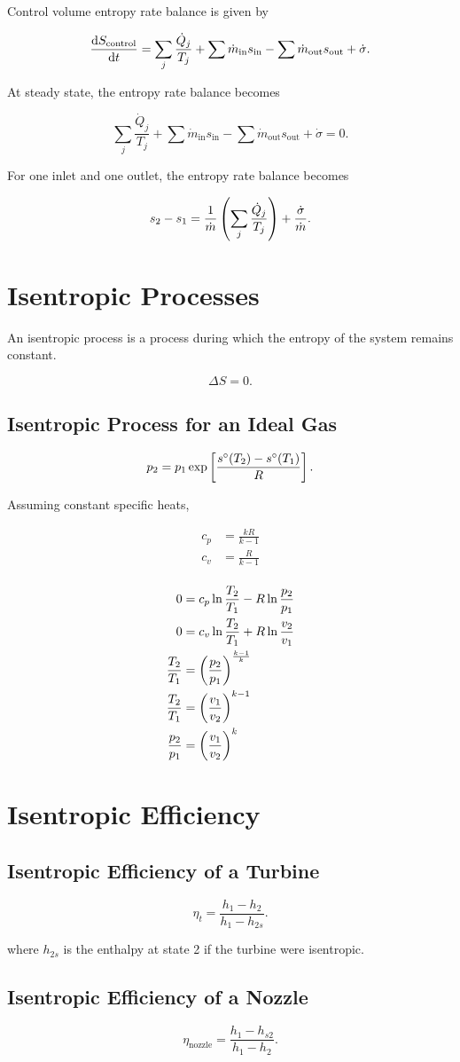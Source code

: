 \documentclass{report}
\begin{document}
Control volume entropy rate balance is given by

\[
	\dv{S_\text{control}}{t} = \sum_j \frac{\dot{Q}_j}{T_j} + \sum \dot{m}_\text{in} s_\text{in} - \sum \dot{m}_\text{out} s_\text{out} + \dot{\sigma}
	.\]

At steady state, the entropy rate balance becomes

\[
	\sum_j \frac{\dot{Q}_j}{T_j} + \sum \dot{m}_\text{in} s_\text{in} - \sum \dot{m}_\text{out} s_\text{out} + \dot{\sigma} = 0
	.\]

For one inlet and one outlet, the entropy rate balance becomes

\[
	s_2 - s_1 = \frac{1}{\dot{m}} \left( \sum_j \frac{\dot{Q}_j}{T_j} \right) + \frac{\dot{\sigma}}{\dot{m}}
	.\]

\section{Isentropic Processes}

An isentropic process is a process during which the entropy of the system remains constant.

\[
	\Delta S = 0
	.\]

\subsection{Isentropic Process for an Ideal Gas}

\[
	p_2 = p_1 \exp\left[ \frac{s^\circ(T_2) - s^\circ(T_1)}{R} \right]
	.\]

Assuming constant specific heats,

\begin{align*}
	c_p & = \frac{kR}{k-1} \\
	c_v & = \frac{R}{k-1}  \\
\end{align*}

\begin{align*}
	0               & = c_p \ln\frac{T_2}{T_1} - R\ln\frac{p_2}{p_1} \\
	0               & = c_v \ln\frac{T_2}{T_1} + R\ln\frac{v_2}{v_1} \\
	\frac{T_2}{T_1} & = \left(\frac{p_2}{p_1}\right)^{\frac{k-1}{k}}      \\
	\frac{T_2}{T_1} & = \left(\frac{v_1}{v_2}\right)^{k-1}                \\
	\frac{p_2}{p_1} & = \left(\frac{v_1}{v_2}\right)^k
\end{align*}

\section{Isentropic Efficiency}

\subsection{Isentropic Efficiency of a Turbine}

\[
	\eta_t = \frac{h_1 - h_2}{h_1 - h_{2s}}
	.\]

where $h_{2s}$ is the enthalpy at state 2 if the turbine were isentropic.

\subsection{Isentropic Efficiency of a Nozzle}

\[
	\eta_\text{nozzle} = \frac{h_1 - h_{s2}}{h_1-h_2}
	.\]
\end{document}
